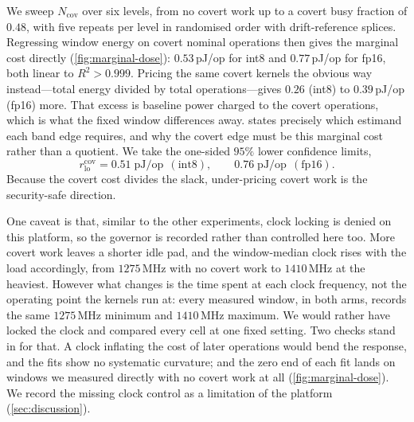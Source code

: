 \documentclass{article}
\theoremstyle{plain}
\theoremstyle{definition}
\theoremstyle{remark}
\begin{document}
We sweep $N_{\mathrm{cov}}$ over six levels, from no covert work up to a covert
busy fraction of $0.48$, with five repeats per level in randomised order with
drift-reference splices. Regressing window energy on covert nominal operations
then gives the marginal cost directly (\cref{fig:marginal-dose}):
$0.53$\,pJ/op for int8 and $0.77$\,pJ/op for fp16, both linear to
$R^2 > 0.999$. Pricing the same covert kernels the obvious way instead---total
energy divided by total operations---gives $0.26$ (int8) to $0.39$\,pJ/op
(fp16) more. That excess is baseline power charged to the covert operations,
which is what the fixed window differences away.  states
precisely which estimand each band edge requires, and why the covert edge
must be this marginal cost rather than a quotient. We take the one-sided $95\%$ lower confidence limits,
\begin{equation}
	r_{\mathrm{lo}}^{\mathrm{cov}} = 0.51\;\mathrm{pJ/op}\ \ (\text{int8}),
	\qquad
	0.76\;\mathrm{pJ/op}\ \ (\text{fp16}).
	\label{eq:measuredcov}
\end{equation}
Because the covert cost divides the slack, under-pricing covert work
is the security-safe direction. 

One caveat is that, similar to the other experiments, clock locking is denied on this platform, so the governor is
recorded rather than controlled here too. More covert work leaves a shorter
idle pad, and the window-median clock rises with the load accordingly, from
$1275$\,MHz with no covert work to $1410$\,MHz at the heaviest. However what changes is
the time spent at each clock frequency, not the operating point the kernels run at:
every measured window, in both arms, records the same $1275$\,MHz minimum and
$1410$\,MHz maximum. We would rather have locked the clock and compared every cell at one
fixed setting. Two checks stand in for that. A clock inflating the cost of
later operations would bend the response, and the fits show no systematic
curvature; and the zero end of each fit lands on windows we measured directly
with no covert work at all (\cref{fig:marginal-dose}). We record the missing
clock control as a limitation of the platform (\cref{sec:discussion}).
\end{document}

